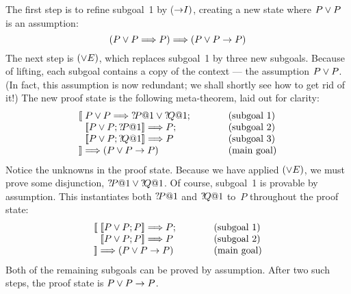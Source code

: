 The first step is to refine subgoal~1 by (${\rightarrow}I)$, creating a new state
where $P\vee P$ is an assumption:
\[ (P\vee P\Longrightarrow P)\Longrightarrow (P\vee P\rightarrow P) \]
The next step is $(\vee E)$, which replaces subgoal~1 by three new subgoals. 
Because of lifting, each subgoal contains a copy of the context --- the
assumption $P\vee P$.  (In fact, this assumption is now redundant; we shall
shortly see how to get rid of it!)  The new proof state is the following
meta-theorem, laid out for clarity:
\[ \begin{array}{l@{}l@{\qquad\qquad}l} 
  \lbrakk\;& P\disj P\Imp \Var{P@1}\disj\Var{Q@1}; & \hbox{(subgoal 1)} \\
           & \List{P\disj P; \Var{P@1}} \Imp P;    & \hbox{(subgoal 2)} \\
           & \List{P\disj P; \Var{Q@1}} \Imp P     & \hbox{(subgoal 3)} \\
  \rbrakk\;& \Imp (P\disj P\imp P)                 & \hbox{(main goal)}
   \end{array} 
\]
Notice the unknowns in the proof state.  Because we have applied $(\vee E)$,
we must prove some disjunction, ${?\!P@1}\vee{?\!Q@1}$.  Of course,
subgoal~1 is provable by assumption.  This instantiates both ${?\!P@1}$ and
${?\!Q@1}$ to~$P$ throughout the proof state:
\[ \begin{array}{l@{}l@{\qquad\qquad}l} 
    \lbrakk\;& \List{P\disj P; P} \Imp P; & \hbox{(subgoal 1)} \\
             & \List{P\disj P; P} \Imp P  & \hbox{(subgoal 2)} \\
    \rbrakk\;& \Imp (P\disj P\imp P)      & \hbox{(main goal)}
   \end{array} \]
Both of the remaining subgoals can be proved by assumption.  After two such
steps, the proof state is $P\vee P\rightarrow P$.


